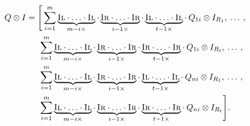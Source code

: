 \begin{equation} \label{eq:gen_tensor_identity}
  \begin{split}
   Q \otimes I & =  \Bigg[ \sum_{i=1}^{m}  \underbrace{\textsc{Il} \cdot \ldots \cdot \textsc{Il}}_{m-i\times} \cdot \underbrace{\textsc{Ir} \cdot \ldots \cdot \textsc{Ir}}_{i-1  \times}  \cdot  \underbrace{\textsc{Il} \cdot \ldots \cdot \textsc{Il}}_{t-1 \times} \cdot \hspace{2pt} Q_{1i} \otimes I_{R_1}, \hspace{2pt} \ldots \hspace{2pt},  \\
   & \hspace{15pt} \sum_{i=1}^{m}  \underbrace{\textsc{Il} \cdot \ldots \cdot \textsc{Il}}_{m-i\times} \cdot \underbrace{\textsc{Ir} \cdot \ldots \cdot \textsc{Ir}}_{i-1  \times}  \cdot  \underbrace{\textsc{Ir} \cdot \ldots \cdot \textsc{Ir}}_{t-1 \times} \cdot \hspace{2pt} Q_{1i} \otimes I_{R_t} , \hspace{2pt} \ldots \hspace{2pt}, \\
    & \hspace{15pt}  \sum_{i=1}^{m}  \underbrace{\textsc{Il} \cdot \ldots \cdot \textsc{Il}}_{m-i\times} \cdot \underbrace{\textsc{Ir} \cdot \ldots \cdot \textsc{Ir}}_{i-1  \times}  \cdot  \underbrace{\textsc{Il} \cdot \ldots \cdot \textsc{Il}}_{t-1 \times} \cdot \hspace{2pt} Q_{ni} \otimes I_{R_1}, \hspace{2pt} \ldots \hspace{2pt},  \\
    & \hspace{15pt}  \sum_{i=1}^{m}  \underbrace{\textsc{Il} \cdot \ldots \cdot \textsc{Il}}_{m-i\times} \cdot \underbrace{\textsc{Ir} \cdot \ldots \cdot \textsc{Ir}}_{i-1  \times}  \cdot  \underbrace{\textsc{Ir} \cdot \ldots \cdot \textsc{Ir}}_{t-1 \times} \cdot \hspace{2pt} Q_{ni} \otimes I_{R_t}\Bigg].
  \end{split}
\end{equation}



